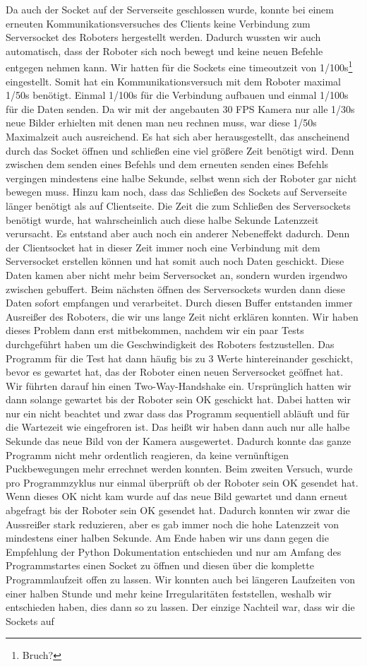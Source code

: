 Da auch der Socket auf der Serverseite geschlossen wurde, konnte bei einem erneuten Kommunikationsversuches des Clients keine Verbindung zum Serversocket des Roboters hergestellt werden. Dadurch wussten wir auch automatisch, dass der Roboter sich noch bewegt und keine neuen Befehle entgegen nehmen kann. Wir hatten für die Sockets eine timeoutzeit von 1/100s\footnote{Bruch?} eingestellt. Somit hat ein Kommunikationsversuch mit dem Roboter maximal 1/50s benötigt. Einmal  1/100s für die Verbindung aufbauen und einmal 1/100s für die Daten senden. Da wir mit der angebauten 30 FPS Kamera nur alle 1/30s neue Bilder erhielten mit denen man neu rechnen muss, war diese 1/50s Maximalzeit auch ausreichend. Es hat sich aber herausgestellt, das anscheinend durch das Socket öffnen und schließen eine viel größere Zeit benötigt wird. Denn zwischen dem senden eines Befehls und dem erneuten senden eines Befehls vergingen mindestens eine halbe Sekunde, selbst wenn sich der Roboter gar nicht bewegen muss. Hinzu kam noch, dass das Schließen des Sockets auf Serverseite länger benötigt als auf Clientseite. Die Zeit die zum Schließen des Serversockets benötigt wurde, hat wahrscheinlich auch diese halbe Sekunde Latenzzeit verursacht. Es entstand aber auch noch ein anderer Nebeneffekt dadurch. Denn der Clientsocket hat in dieser Zeit immer noch eine Verbindung mit dem Serversocket erstellen können und hat somit auch noch Daten geschickt. Diese Daten kamen aber nicht mehr beim Serversocket an, sondern wurden irgendwo zwischen gebuffert. Beim nächsten öffnen des Serversockets wurden dann diese Daten sofort empfangen und verarbeitet. Durch diesen Buffer entstanden immer Ausreißer des Roboters, die wir uns lange Zeit nicht erklären konnten. Wir haben dieses Problem dann erst mitbekommen, nachdem wir ein paar Tests durchgeführt haben um die Geschwindigkeit des Roboters festzustellen. Das Programm für die Test hat dann häufig bis zu 3 Werte hintereinander geschickt, bevor es gewartet hat, das der Roboter einen neuen Serversocket geöffnet hat. Wir führten darauf hin einen Two-Way-Handshake ein. Ursprünglich hatten wir dann solange gewartet bis der Roboter sein OK geschickt hat. Dabei hatten wir nur ein nicht beachtet und zwar dass das Programm sequentiell abläuft und für die Wartezeit wie eingefroren ist. Das heißt wir haben dann auch nur alle halbe Sekunde das neue Bild von der Kamera ausgewertet. Dadurch konnte das ganze Programm nicht mehr ordentlich reagieren, da keine vernünftigen Puckbewegungen mehr errechnet werden konnten. Beim zweiten Versuch, wurde pro Programmzyklus nur einmal überprüft ob der Roboter sein OK gesendet hat. Wenn dieses OK nicht kam wurde auf das neue Bild gewartet und dann erneut abgefragt bis der Roboter sein OK gesendet hat. Dadurch konnten wir zwar die Aussreißer stark reduzieren, aber es gab immer noch die hohe Latenzzeit von mindestens einer halben Sekunde. Am Ende haben wir uns dann gegen die Empfehlung der Python Dokumentation entschieden und nur am Amfang des Programmstartes einen Socket zu öffnen und diesen über die komplette Programmlaufzeit offen zu lassen. Wir konnten auch bei längeren Laufzeiten von einer halben Stunde und mehr keine Irregularitäten feststellen, weshalb wir entschieden haben, dies dann so zu lassen. Der einzige Nachteil war, dass wir die Sockets auf 